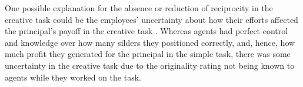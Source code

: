 One possible explanation for the absence or reduction of reciprocity in the creative task could be 
the employees' uncertainty about how their efforts affected the 
principal's payoff in the creative task \citep{Hennig2010}.  
 Whereas agents had 
perfect control and knowledge over how many silders they positioned correctly, and, hence, 
how much profit they generated for the principal in the simple task, there was some uncertainty in 
the creative task due to the originality rating not being known to agents while they worked on the task.



